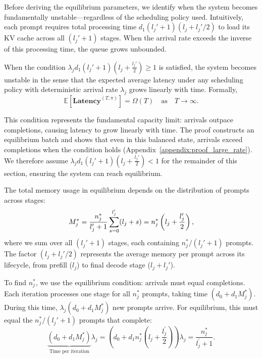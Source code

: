 Before deriving the equilibrium parameters, we identify when the system becomes fundamentally unstable---regardless of the scheduling policy used. Intuitively, each prompt requires total processing time $d_1 (l_j' + 1)(l_j + l_j'/2)$ to load its KV cache across all $(l_j'+1)$ stages. When the arrival rate exceeds the inverse of this processing time, the queue grows unbounded.

\begin{proposition}\label{prop:large_rate}
When the condition $\lambda_j d_1 (l_j' + 1) \left( l_j + \frac{l_j'}{2} \right) \geq 1$ is satisfied, the system becomes unstable in the sense that the expected average latency under any scheduling policy with deterministic arrival rate \( \lambda_j \) grows linearly with time. Formally,
$$
\mathbb{E}[\textbf{Latency}^{(T,\pi)}] = \Omega(T) \quad \text{as} \quad T \to \infty.
$$
\end{proposition}

This condition represents the fundamental capacity limit: arrivals outpace completions, causing latency to grow linearly with time. The proof constructs an equilibrium batch and shows that even in this balanced state, arrivals exceed completions when the condition holds (Appendix~\ref{appendix:proof_large_rate}). We therefore assume $\lambda_j d_1 (l_j' + 1) \left( l_j + \frac{l_j'}{2} \right) <1$ for the remainder of this section, ensuring the system can reach equilibrium.


The total memory usage in equilibrium depends on the distribution of prompts across stages:
\begin{equation}
    M_j^* = \frac{n_j^*}{l_j^{\prime}+1}\sum_{s=0}^{l_j^{\prime}}(l_j+s) = n_j^*\left({l_j+\frac{l_j'}{2}}\right),
\end{equation}
where we sum over all $(l_j'+1)$ stages, each containing $n_j^*/(l_j'+1)$ prompts. The factor $(l_j + l_j'/2)$ represents the average memory per prompt across its lifecycle, from prefill ($l_j$) to final decode stage ($l_j + l_j'$).

To find $n_j^*$, we use the equilibrium condition: arrivals must equal completions. Each iteration processes one stage for all $n_j^*$ prompts, taking time $(d_0 + d_1 M_j^*)$. During this time, $\lambda_j(d_0 + d_1 M_j^*)$ new prompts arrive. For equilibrium, this must equal the $n_j^*/(l_j'+1)$ prompts that complete:
$$ \underset{\text{Time per iteration}}{\underbrace{(d_0+d_1M_j^{*} )}}\lambda_j =\left(d_0+d_1 n_j^*\left( l_j +\frac{l_j^{\prime}}{2} \right) \right)\lambda_j= \frac{n_j^*}{l_j^{\prime}+1}. $$

